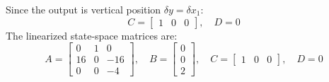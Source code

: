 \documentclass[12pt,onecolumn,twoside ]{article}
\begin{document}
	Since the output is vertical position $\delta y = \delta x_1$: \[
	C = \begin{bmatrix} 1 & 0 & 0 \end{bmatrix}, \quad D = 0
	\] The linearized state-space matrices are: \[
	A = \begin{bmatrix} 0 & 1 & 0 \\ 16 & 0 & -16 \\ 0 & 0 & -4 \end{bmatrix}, \quad B = \begin{bmatrix} 0 \\ 0 \\ 2 \end{bmatrix}, \quad C = \begin{bmatrix} 1 & 0 & 0 \end{bmatrix}, \quad D = 0
	\]
	
\end{document}

